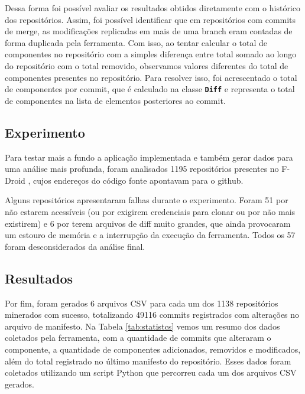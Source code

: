 \documentclass[a4paper,12pt]{article}
\begin{document}
{%

Dessa forma foi possível avaliar os resultados obtidos diretamente com o histórico dos repositórios. Assim, foi possível identificar que em repositórios com commits de merge, as modificações replicadas em mais de uma branch eram contadas de forma duplicada pela ferramenta. Com isso, ao tentar calcular o total de componentes no repositório com a simples diferença entre total somado ao longo do repositório com o total removido, observamos valores diferentes do total de componentes presentes no repositório.  Para resolver isso, foi acrescentado o total de componentes por commit, que é calculado na classe {\small\texttt{\textbf{Diff}}} e representa o total de componentes na lista de elementos posteriores ao commit.


\subsection{Experimento}%
\label{sec:experimentos}

Para testar mais a fundo a aplicação implementada e também gerar dados para uma análise  mais profunda, foram analisados 1195 repositórios presentes no F-Droid \cite{fdroid}, cujos endereços do código fonte apontavam para o github.

Alguns repositórios apresentaram falhas durante o experimento. Foram 51 por não estarem acessíveis (ou por exigirem credenciais para clonar ou por não mais existirem) e 6 por terem arquivos de diff muito grandes, que ainda provocaram um estouro de memória e a interrupção da execução da ferramenta. Todos os 57 foram desconsiderados da análise final. 


\subsection{Resultados}%
\label{sec:resultados}
Por fim, foram gerados 6 arquivos CSV para cada um dos 1138 repositórios minerados com sucesso, totalizando 49116 commits registrados com alterações no arquivo de manifesto. Na Tabela \ref{tab:statistcs} vemos um resumo dos dados coletados pela ferramenta, com a quantidade de commits que alteraram o componente, a quantidade de componentes adicionados, removidos e modificados, além do total registrado no último manifesto do repositório. Esses dados foram coletados utilizando um script Python que percorreu cada um dos arquivos CSV gerados.

}
\end{document}
